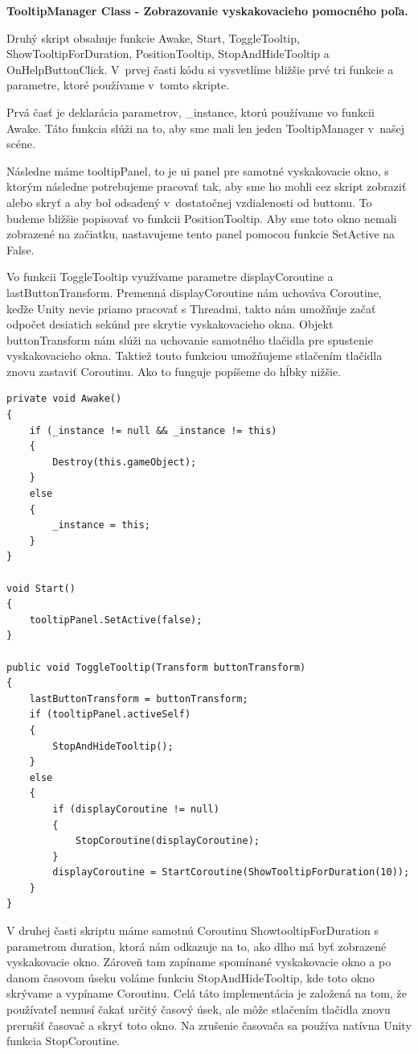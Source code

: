 {\normalsize\textbf{TooltipManager Class - Zobrazovanie vyskakovacieho pomocného poľa.}}

Druhý skript obsahuje funkcie Awake, Start, ToggleTooltip, ShowTooltipForDuration, PositionTooltip, StopAndHideTooltip a OnHelpButtonClick. V~prvej časti kódu si vysvetlíme bližšie prvé tri funkcie a parametre, ktoré používame v~tomto skripte. 

Prvá časť je deklarácia parametrov, \_instance, ktorú používame vo funkcii Awake. Táto funkcia slúži na to, aby sme mali len jeden TooltipManager v~našej scéne. 

Následne máme tooltipPanel, to je \gls{ui} panel pre samotné vyskakovacie okno, s ktorým následne potrebujeme pracovať tak, aby sme ho mohli cez skript zobraziť alebo skryť a aby bol odsadený v~dostatočnej vzdialenosti od buttonu. To budeme bližšie popisovať vo funkcii PositionTooltip. Aby sme toto okno nemali zobrazené na začiatku, nastavujeme tento panel pomocou funkcie SetActive na False.

Vo funkcii ToggleTooltip využívame parametre displayCoroutine a lastButtonTransform. Premenná displayCoroutine nám uchováva Coroutine, keďže Unity nevie priamo pracovať s Threadmi, takto nám umožňuje začať odpočet desiatich sekúnd pre skrytie vyskakovacieho okna. Objekt buttonTransform nám slúži na uchovanie samotného tlačidla pre spustenie vyskakovacieho okna. Taktiež touto funkciou umožňujeme stlačením tlačidla znovu zastaviť Coroutinu. Ako to funguje popíšeme do hĺbky nižšie.

\lstset{style=Csharp}
\begin{lstlisting}[caption={TooltipManager Class - Zobrazovanie vyskakovacieho pomocného poľa. Part 1}, label=tooltipManagerPart1]
private void Awake()
{
    if (_instance != null && _instance != this)
    {
        Destroy(this.gameObject);
    }
    else
    {
        _instance = this;
    }
}

void Start()
{
    tooltipPanel.SetActive(false);
}

public void ToggleTooltip(Transform buttonTransform)
{
    lastButtonTransform = buttonTransform; 
    if (tooltipPanel.activeSelf)
    {
        StopAndHideTooltip(); 
    }
    else
    {
        if (displayCoroutine != null)
        {
            StopCoroutine(displayCoroutine); 
        }
        displayCoroutine = StartCoroutine(ShowTooltipForDuration(10));
    }
}
\end{lstlisting}

V druhej časti skriptu máme samotnú Coroutinu ShowtooltipForDuration s parametrom duration, ktorá nám odkazuje na to, ako dlho má byť zobrazené vyskakovacie okno. Zároveň tam zapíname spomínané vyskakovacie okno a po danom časovom úseku voláme funkciu StopAndHideTooltip, kde toto okno skrývame a vypíname Coroutinu. Celá táto implementácia je založená na tom, že používateľ nemusí čakať určitý časový úsek, ale môže stlačením tlačidla znovu prerušiť časovač a skryť toto okno. Na zrušenie časovača sa používa natívna Unity funkcia StopCoroutine.

